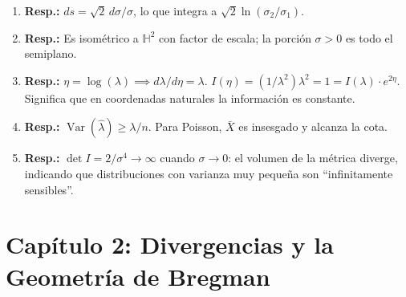 \begin{enumerate}
	\item \textbf{Resp.:} $ds = \sqrt{2}\, d\sigma/\sigma$, lo que integra a $\sqrt{2}\ln(\sigma_2/\sigma_1)$.
	\item \textbf{Resp.:} Es isométrico a $\mathbb{H}^2$ con factor de escala; la porción $\sigma > 0$ es todo el semiplano.
	\item \textbf{Resp.:} $\eta = \log(\lambda) \implies d\lambda/d\eta = \lambda$. $I(\eta) = (1/\lambda^2)\lambda^2 = 1 = I(\lambda)\cdot e^{2\eta}$. Significa que en coordenadas naturales la información es constante.
	\item \textbf{Resp.:} $\operatorname{Var}(\hat\lambda) \ge \lambda/n$. Para Poisson, $\bar X$ es insesgado y alcanza la cota.
	\item \textbf{Resp.:} $\det I = 2/\sigma^4 \to \infty$ cuando $\sigma \to 0$: el volumen de la métrica diverge, indicando que distribuciones con varianza muy pequeña son ``infinitamente sensibles''.
\end{enumerate}

\section*{Capítulo 2: Divergencias y la Geometría de Bregman}

